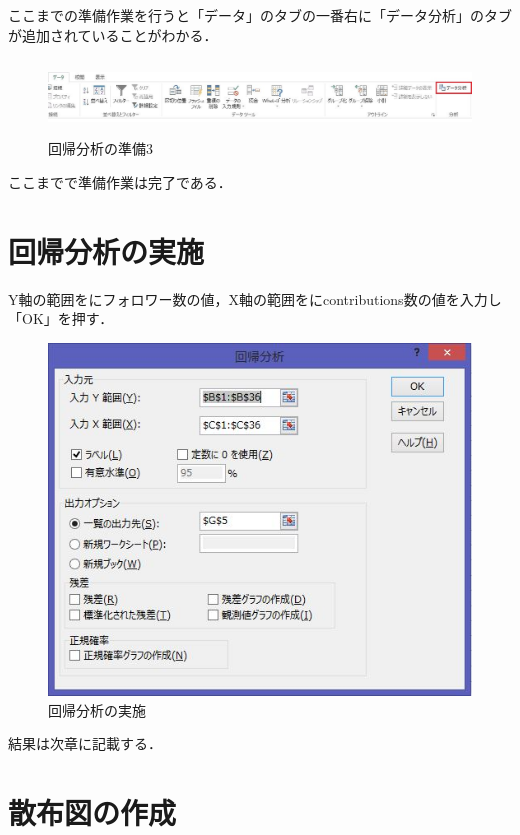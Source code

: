 \newpage

ここまでの準備作業を行うと「データ」のタブの一番右に「データ分析」のタブが追加されていることがわかる．
\begin{figure}[htb]
\centering
\includegraphics[height=2cm,width=15cm]{seikou.JPG}
\caption{回帰分析の準備3}\label{サンプル図}
\end{figure}
ここまでで準備作業は完了である．

\newpage

\section{回帰分析の実施}

Y軸の範囲をにフォロワー数の値，X軸の範囲をにcontributions数の値を入力し「OK」を押す． 

\begin{figure}[htb]
\centering
\includegraphics[width=12cm]{kaikiki.JPG}
\caption{回帰分析の実施}\label{サンプル図}
\end{figure}
結果は次章に記載する．

\newpage

\section{散布図の作成}

